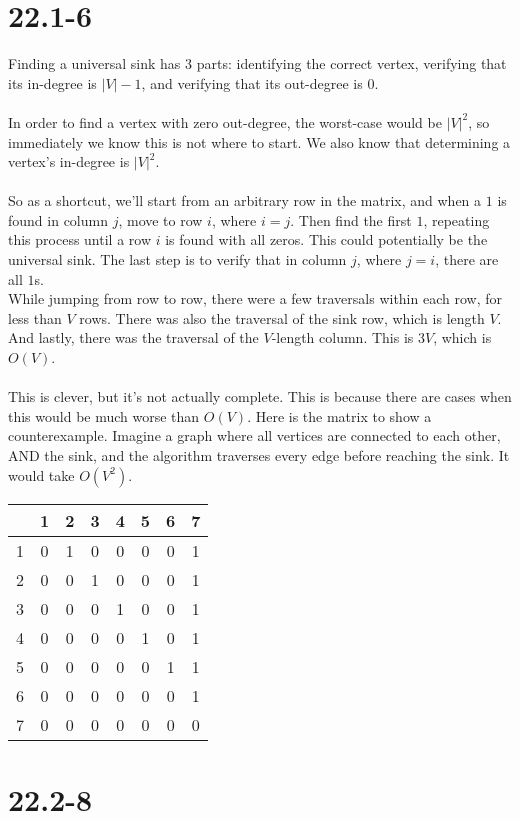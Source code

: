 \documentclass{article}
\begin{document}
\section*{22.1-6}
Finding a universal sink has 3 parts: identifying the correct vertex, verifying that its in-degree is
$|V|-1$, and verifying that its out-degree is $0$.\\
\\
In order to find a vertex with zero out-degree, the worst-case would be $|V|^2$, so immediately we know this
is not where to start. We also know that determining a vertex's in-degree is $|V|^2$.\\
\\
So as a shortcut, we'll start from an arbitrary row in the matrix, and when a $1$ is found in column $j$,
move to row $i$, where $i = j$. Then find the first $1$, repeating this process until a row $i$ is found with all
zeros. This could potentially be the universal sink. The last step is to verify that in column $j$, where $j = i$,
there are all $1$s.\\
While jumping from row to row, there were a few traversals within each row, for less than $V$ rows. There was also
the traversal of the sink row, which is length $V$. And lastly, there was the traversal of the $V$-length column.
This is $3V$, which is $O(V)$.\\
\\
This is clever, but it's not actually complete. This is because there are cases when this would be much worse than
$O(V)$. Here is the matrix to show a counterexample. Imagine a graph where all vertices are connected to each other,
AND the sink, and the algorithm traverses every edge before reaching the sink. It would take $O(V^2)$.\\
\begin{tabular}{|c|c c c c c c c|}
\hline
  & 1 & 2 & 3 & 4 & 5 & 6 & 7\\
\hline
1 & 0 & 1 & 0 & 0 & 0 & 0 & 1\\
2 & 0 & 0 & 1 & 0 & 0 & 0 & 1\\
3 & 0 & 0 & 0 & 1 & 0 & 0 & 1\\
4 & 0 & 0 & 0 & 0 & 1 & 0 & 1\\
5 & 0 & 0 & 0 & 0 & 0 & 1 & 1\\
6 & 0 & 0 & 0 & 0 & 0 & 0 & 1\\
7 & 0 & 0 & 0 & 0 & 0 & 0 & 0\\
\hline
\end{tabular}

\section*{22.2-8}
\end{document}
